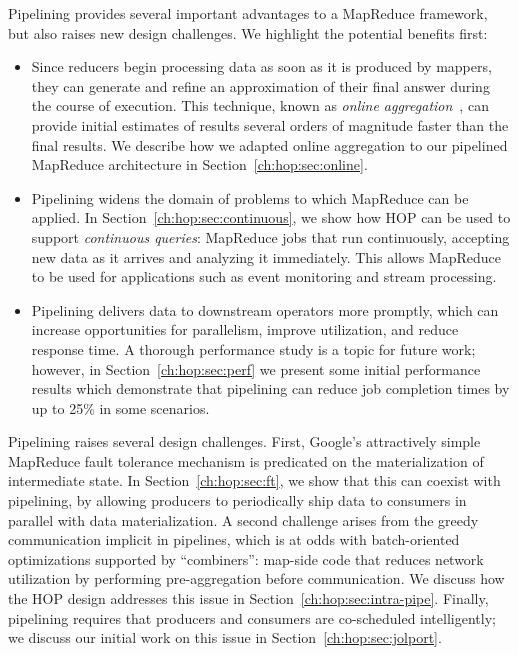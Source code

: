 Pipelining provides several important advantages to a MapReduce
framework, but also raises new design challenges. We highlight the
potential benefits first:
\begin{itemize}
\item
  Since reducers begin processing data as soon as it is produced by mappers,
  they can generate and refine an approximation of their final answer during the
  course of execution. This technique, known as \emph{online
    aggregation}~\cite{onlineagg}, can provide initial estimates of results
  several orders of magnitude faster than the final results.  We
  describe how we adapted online aggregation to our pipelined MapReduce
  architecture in Section~\ref{ch:hop:sec:online}.

\item
  Pipelining widens the domain of problems to which MapReduce can be applied. In
  Section~\ref{ch:hop:sec:continuous}, we show how HOP can be used to support
  \emph{continuous queries}: MapReduce jobs that run continuously, accepting new
  data as it arrives and analyzing it immediately. This allows MapReduce to be
  used for applications such as event monitoring and stream processing.

\item
  Pipelining delivers data to downstream operators more promptly, which can
  increase opportunities for parallelism, improve utilization, and reduce
  response time. A thorough performance study is a topic for future work;
  however, in Section~\ref{ch:hop:sec:perf} we present some initial performance
  results which demonstrate that pipelining can reduce job completion times by
  up to 25\% in some scenarios.
\end{itemize}

Pipelining raises several design challenges.  First, Google's attractively
simple MapReduce fault tolerance mechanism is predicated on the materialization
of intermediate state.  In Section~\ref{ch:hop:sec:ft}, we show that this can
coexist with pipelining, by allowing producers to periodically ship data to
consumers in parallel with data materialization.  A second challenge arises
from the greedy communication implicit in pipelines, which is at odds with
batch-oriented optimizations supported by ``combiners'': map-side code that
reduces network utilization by performing pre-aggregation before communication.
We discuss how the HOP design addresses this issue in
Section~\ref{ch:hop:sec:intra-pipe}.  Finally, pipelining requires that
producers and consumers are co-scheduled intelligently; we discuss our initial
work on this issue in Section~\ref{ch:hop:sec:jolport}.

